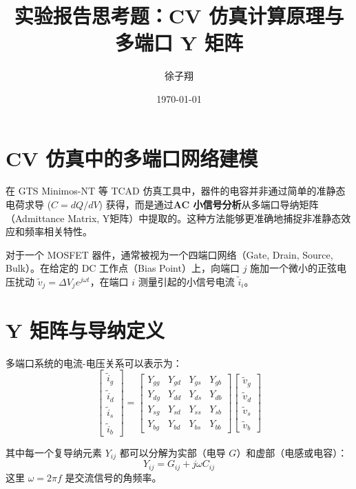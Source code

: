 \documentclass[11pt,a4paper]{article}
\begin{document}
\title{\textbf{实验报告思考题：CV 仿真计算原理与多端口 Y 矩阵}}
\author{徐子翔}
\date{\today}
\maketitle

\section{CV 仿真中的多端口网络建模}

在 GTS Minimos-NT 等 TCAD 仿真工具中，器件的电容并非通过简单的准静态电荷求导 ($C = dQ/dV$) 获得，而是通过\textbf{AC 小信号分析}从多端口导纳矩阵（Admittance Matrix, Y矩阵）中提取的。这种方法能够更准确地捕捉非准静态效应和频率相关特性。

对于一个 MOSFET 器件，通常被视为一个四端口网络（Gate, Drain, Source, Bulk）。在给定的 DC 工作点（Bias Point）上，向端口 $j$ 施加一个微小的正弦电压扰动 $\tilde{v}_j = \Delta V_j e^{j\omega t}$，在端口 $i$ 测量引起的小信号电流 $\tilde{i}_i$。

\section{Y 矩阵与导纳定义}

多端口系统的电流-电压关系可以表示为：
\begin{equation}
\begin{bmatrix}
\tilde{i}_g \\
\tilde{i}_d \\
\tilde{i}_s \\
\tilde{i}_b
\end{bmatrix}
=
\begin{bmatrix}
Y_{gg} & Y_{gd} & Y_{gs} & Y_{gb} \\
Y_{dg} & Y_{dd} & Y_{ds} & Y_{db} \\
Y_{sg} & Y_{sd} & Y_{ss} & Y_{sb} \\
Y_{bg} & Y_{bd} & Y_{bs} & Y_{bb}
\end{bmatrix}
\begin{bmatrix}
\tilde{v}_g \\
\tilde{v}_d \\
\tilde{v}_s \\
\tilde{v}_b
\end{bmatrix}
\end{equation}

其中每一个复导纳元素 $Y_{ij}$ 都可以分解为实部（电导 $G$）和虚部（电感或电容）：
\begin{equation}
Y_{ij} = G_{ij} + j\omega C_{ij}
\end{equation}
这里 $\omega = 2\pi f$ 是交流信号的角频率。
\end{document}
